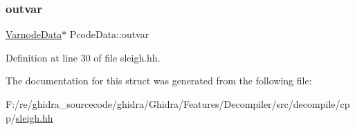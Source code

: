 \mbox{\label{struct_pcode_data_a59a94589691bb191caf9efdc7e1d7b1d}} 
\subsubsection{\texorpdfstring{outvar}{outvar}}
{\footnotesize\ttfamily \mbox{\hyperlink{struct_varnode_data}{Varnode\+Data}}$\ast$ Pcode\+Data\+::outvar}



Definition at line 30 of file sleigh.\+hh.



The documentation for this struct was generated from the following file\+:\begin{DoxyCompactItemize}
\item 
F\+:/re/ghidra\+\_\+sourcecode/ghidra/\+Ghidra/\+Features/\+Decompiler/src/decompile/cpp/\mbox{\hyperlink{sleigh_8hh}{sleigh.\+hh}}\end{DoxyCompactItemize}
